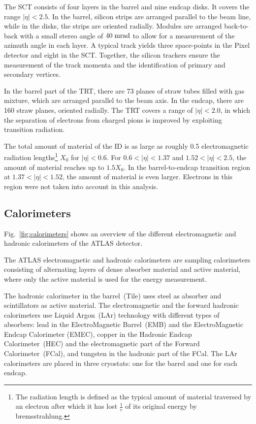The SCT consists of four layers in the barrel and nine endcap disks.
It covers the range \mbox{$|\eta| < 2.5$}.
In the barrel, silicon strips are arranged parallel to the beam line, while in the disks, the strips are oriented radially.
Modules are arranged back-to-back with a small stereo angle of \mbox{$40 \; \mathrm{mrad}$} to allow for a measurement of the azimuth angle in each layer.
A typical track yields three space-points in the Pixel detector and eight in the SCT.
Together, the silicon trackers ensure the measurement of the track momenta and the identification of primary and secondary vertices.

In the barrel part of the TRT, there are 73 planes of straw tubes
filled with gas mixture, which are arranged parallel to the beam axis.
In the endcap, there are 160 straw planes, oriented radially.
The TRT covers a range of \mbox{$|\eta| < 2.0$}, 
in which the separation of electrons from charged pions
is improved by exploiting transition radiation.

The total amount of material of the ID is as large as roughly 0.5 electromagnetic radiation
lengths\footnote{The radiation length is defined as the typical amount of material traversed by an electron after which it has lost
$\frac{1}{e}$ of its original energy by bremsstrahlung.}
$X_0$ for \mbox{$|\eta| < 0.6$}.
For \mbox{$0.6 < |\eta| < 1.37$} and \mbox{$1.52 < |\eta| < 2.5$}, the amount of material reaches up to \mbox{$1.5 X_0$}.
In the barrel-to-endcap transition region at \mbox{$1.37 < |\eta| < 1.52$}, the amount of material is even larger.
Electrons in this region were not taken into account in this analysis.

\subsection{Calorimeters}
\label{sec:calorimeter}

Fig.~\ref{fig:calorimeters} shows an overview of the different electromagnetic and hadronic calorimeters of the ATLAS detector.

The ATLAS electromagnetic and hadronic calorimeters are sampling
calorimeters consisting of alternating layers of dense absorber
material and active material, where only the active
material is used for the energy measurement.

The hadronic calorimeter in the barrel~(Tile) uses steel as absorber
and scintillators as active material.
The electromagnetic and the forward hadronic calorimeters use Liquid
Argon~(LAr) technology with different types of absorbers:
lead in the ElectroMagnetic Barrel~(EMB) and the ElectroMagnetic
Endcap Calorimeter (EMEC), copper in the Hadronic Endcap
Calorimeter~(HEC) and the electromagnetic part of the Forward Calorimeter~(FCal),
and tungsten in the hadronic part of the FCal.
The LAr calorimeters are placed in three cryostats: one for the barrel and one for each endcap.

